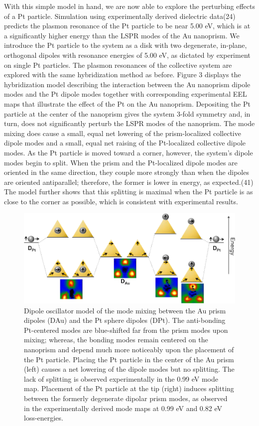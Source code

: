 \documentclass [11pt, proquest] {uwthesis}[2016/11/22]
\begin{document}
With this simple model in hand, we are now able to explore the perturbing effects of a Pt particle. Simulation using experimentally derived dielectric data(24) predicts the plasmon resonance of the Pt particle to be near 5.00 eV, which is at a significantly higher energy than the LSPR modes of the Au nanoprism. We introduce the Pt particle to the system as a disk with two degenerate, in-plane, orthogonal dipoles with resonance energies of 5.00 eV, as dictated by experiment on single Pt particles. The plasmon resonances of the collective system are explored with the same hybridization method as before.
Figure 3 displays the hybridization model describing the interaction between the Au nanoprism dipole modes and the Pt dipole modes together with corresponding experimental EEL maps that illustrate the effect of the Pt on the Au nanoprism. Depositing the Pt particle at the center of the nanoprism gives the system 3-fold symmetry and, in turn, does not significantly perturb the LSPR modes of the nanoprism. The mode mixing does cause a small, equal net lowering of the prism-localized collective dipole modes and a small, equal net raising of the Pt-localized collective dipole modes. As the Pt particle is moved toward a corner, however, the system’s dipole modes begin to split. When the prism and the Pt-localized dipole modes are oriented in the same direction, they couple more strongly than when the dipoles are oriented antiparallel; therefore, the former is lower in energy, as expected.(41) The model further shows that this splitting is maximal when the Pt particle is as close to the corner as possible, which is consistent with experimental results.

\begin{figure}
\includegraphics{prisms_theory.png}
\caption{Dipole oscillator model of the mode mixing between the Au prism dipoles (DAu) and the Pt sphere dipoles (DPt). The anti-bonding Pt-centered modes are blue-shifted far from the prism modes upon mixing; whereas, the bonding modes remain centered on the nanoprism and depend much more noticeably upon the placement of the Pt particle. Placing the Pt particle in the center of the Au prism (left) causes a net lowering of the dipole modes but no splitting. The lack of splitting is observed experimentally in the 0.99 eV mode map. Placement of the Pt particle at the tip (right) induces splitting between the formerly degenerate dipolar prism modes, as observed in the experimentally derived mode maps at 0.99 eV and 0.82 eV loss-energies.}
\label{mo_diagram}
\end{figure}
\end{document}

